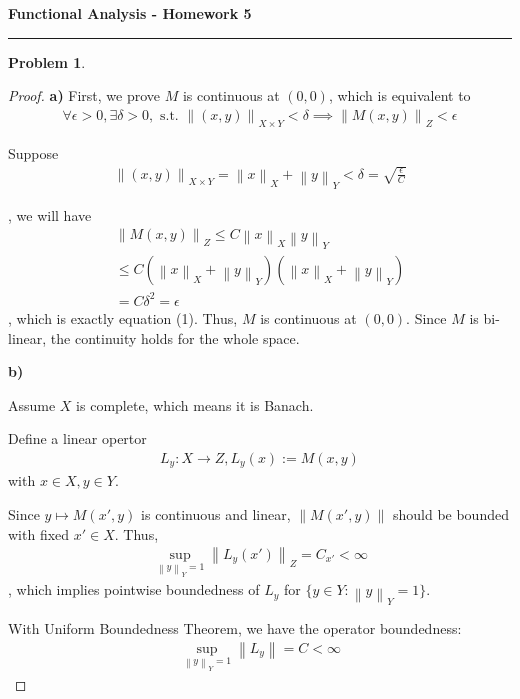 \documentclass{article}
\newcommand{\norm}[1]{\left\|#1\right\|}
\newtheorem{problem}{Problem}
\begin{document}
\begin{center}
    \textbf{\Large Functional Analysis - Homework 5}
\end{center}

\hrule
\vspace{0.5em}

\begin{problem}
\end{problem}
\begin{proof}
\textbf{a)}
First, we prove $M$ is continuous at $(0, 0)$, which is equivalent to
\begin{gather}
\forall \epsilon > 0, \exists \delta > 0, \text{ s.t. }
\norm{(x,y)}_{X \times Y} < \delta
\implies
\norm{M(x, y)}_Z < \epsilon
\end{gather}

Suppose
\begin{gather}
    \norm{(x,y)}_{X \times Y} 
    = \norm{x}_X + \norm{y}_Y < \delta = \sqrt{\frac{\epsilon}{C}}
\end{gather}

, we will have
\begin{gather}
    \norm{M(x, y)}_Z 
    \leq C \norm{x}_X \norm{y}_Y
    \\
    \leq C (\norm{x}_X + \norm{y}_Y) (\norm{x}_X + \norm{y}_Y)
    \\
    = C \delta^2 = \epsilon
\end{gather}
, which is exactly equation (1). Thus, $M$ is continuous at $(0, 0)$.
Since $M$ is bi-linear, the continuity holds for the whole space.

\textbf{b)}

Assume $X$ is complete, which means it is Banach. 

Define a linear opertor
\begin{gather}
    L_y: X \to Z, L_y (x) := M(x, y)
\end{gather}
with $x \in X, y \in Y$.

Since $ y \mapsto M(x',y) $ is continuous and linear, $\norm{M(x',y)}$ should be bounded with fixed $x' \in X$. Thus,
\begin{gather}
    \sup_{\norm{y}_Y=1} \norm{L_y(x')}_Z
    = C_{x'}
    < \infty
\end{gather}
, which implies pointwise boundedness of $L_y$ for $\{y \in Y : \norm{y}_Y=1\}$.

With Uniform Boundedness Theorem, we have the operator boundedness:
\begin{gather}
    \sup_{\norm{y}_Y=1} \norm{L_y}
    = C
    < \infty
\end{gather}


\end{proof}
\end{document}
